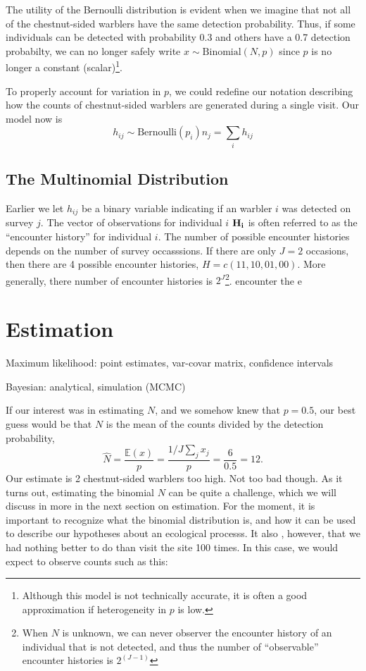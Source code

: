 The utility of the Bernoulli distribution is evident when we imagine
that not all of the chestnut-sided warblers have the same detection
probability. Thus, if some individuals can be detected with
probability 0.3 and others have a 0.7 detection probabilty, we can no
longer safely write $x \sim \text{Binomial}(N, p)$ since $p$ is no
longer a constant (scalar)\footnote{Although this model is not
  technically accurate, it is often a good approximation if
  heterogeneity in $p$ is low.}.

To properly account for variation in $p$, we could redefine our notation
describing how the counts of chestnut-sided warblers are generated during a
single visit. Our model now is
\[
h_{ij} \sim \text{Bernoulli}(p_i)
n_j = \sum_i h_{ij}
\]


\subsection{The Multinomial Distribution}


Earlier we let $h_{ij}$ be a binary variable indicating if an
warbler $i$ was detected on survey $j$. The vector of observations for
individual $i$ $\bf H_i$ is often referred to as the ``encounter
history'' for individual $i$. The number of possible encounter
histories depends on the number of survey occasssions. If there are
only $J=2$ occasions, then there are 4 possible encounter histories, $H = c(11, 10,
01, 00)$. More generally, there number of encounter histories is
$2^J$\footnote{When $N$ is unknown, we can never observer the
  encounter history of an individual that is not detected, and thus
  the number of ``observable'' encounter histories is $2^(J-1)$}.
encounter
the e






\section{Estimation}


Maximum likelihood: point estimates, var-covar matrix, confidence
intervals

Bayesian: analytical, simulation (MCMC)



If our interest was in estimating $N$, and we somehow
knew that $p=0.5$, our best guess would be that $N$ is the mean of the
counts divided by the detection probability,
\[
\hat{N} = \frac{\mathbb{E}(x)}{p} = \frac{1/J \sum_j x_j}{p} = \frac{6}{0.5} =
12.
\]
Our estimate is 2 chestnut-sided warblers too high. Not too bad
though. As it turns out, estimating the binomial $N$ can be quite a
challenge, which we will discuss in more in the next section on
estimation. For the moment, it is important to recognize what the
binomial distribution is, and how it can be used to describe our
hypotheses about an ecological processs. It also , however, that we had nothing better to do than
visit the site 100 times. In this case, we would expect to observe
counts such as this:


